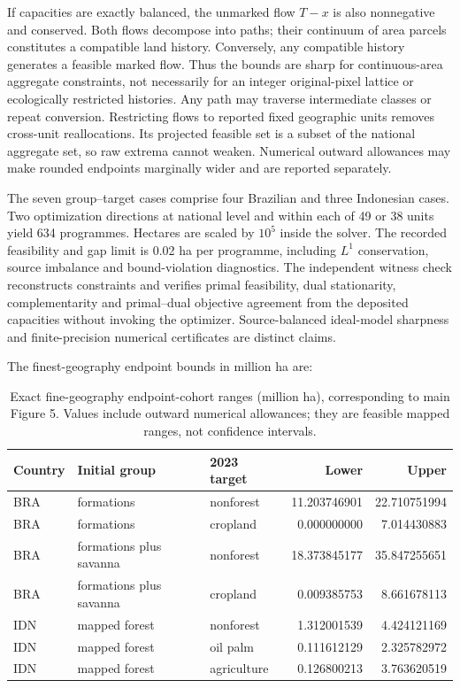 If capacities are exactly balanced, the unmarked flow $T-x$ is also nonnegative and conserved. Both flows decompose into paths; their continuum of area parcels constitutes a compatible land history. Conversely, any compatible history generates a feasible marked flow. Thus the bounds are sharp for continuous-area aggregate constraints, not necessarily for an integer original-pixel lattice or ecologically restricted histories. Any path may traverse intermediate classes or repeat conversion. Restricting flows to reported fixed geographic units removes cross-unit reallocations. Its projected feasible set is a subset of the national aggregate set, so raw extrema cannot weaken. Numerical outward allowances may make rounded endpoints marginally wider and are reported separately.

The seven group--target cases comprise four Brazilian and three Indonesian cases. Two optimization directions at national level and within each of 49 or 38 units yield 634 programmes. Hectares are scaled by $10^5$ inside the solver. The recorded feasibility and gap limit is 0.02 ha per programme, including $L^1$ conservation, source imbalance and bound-violation diagnostics. The independent witness check reconstructs constraints and verifies primal feasibility, dual stationarity, complementarity and primal--dual objective agreement from the deposited capacities without invoking the optimizer. Source-balanced ideal-model sharpness and finite-precision numerical certificates are distinct claims.

The finest-geography endpoint bounds in million ha are:
\begin{table}[htbp]
\centering\small
\caption{Exact fine-geography endpoint-cohort ranges (million ha), corresponding to main Figure 5. Values include outward numerical allowances; they are feasible mapped ranges, not confidence intervals.}\label{tab:SI_conversion_exact}
\begin{tabularx}{\textwidth}{lllrr}\toprule
Country & Initial group & 2023 target & Lower & Upper\\\midrule
BRA & formations & nonforest & 11.203746901 & 22.710751994\\
BRA & formations & cropland & 0.000000000 & 7.014430883\\
BRA & formations plus savanna & nonforest & 18.373845177 & 35.847255651\\
BRA & formations plus savanna & cropland & 0.009385753 & 8.661678113\\
IDN & mapped forest & nonforest & 1.312001539 & 4.424121169\\
IDN & mapped forest & oil palm & 0.111612129 & 2.325782972\\
IDN & mapped forest & agriculture & 0.126800213 & 3.763620519\\
\bottomrule\end{tabularx}
\end{table}


